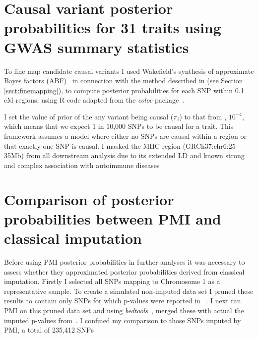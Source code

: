 \documentclass[a4paper,11pt]{report}
\begin{document}
\section{Causal variant posterior probabilities for 31 traits using GWAS summary statistics}
To fine map candidate causal variants I used Wakefield's synthesis of approximate Bayes factors (ABF)~\citep{Wakefield2009} in connection with the method described in \citet{The_Wellcome_Trust_Case_Control_Consortium2012-ad} (see Section \ref{sect:finemapping}), to compute posterior probabilities for each SNP within 0.1 cM regions, using R code adapted from the \textit{coloc} package~\citep{GiambartolomeiVukcevicSchadtEtAl2014}.  

I set the value of prior of the any variant being causal ($\pi_{i}$) to that from \citet{GiambartolomeiVukcevicSchadtEtAl2014}, $10^{-4}$, which means that we expect 1 in 10,000 SNPs to be causal for a trait. This framework assumes a model where either no SNPs are causal within a region or that exactly one SNP is causal. I masked the MHC region (GRCh37:chr6:25-35Mb) from all downstream analysis due to its extended LD and known strong and complex association with autoimmune diseases

\section{Comparison of posterior probabilities between PMI and classical imputation}
Before using PMI posterior probabilities in further analyses it was necessary to assess whether they approximated posterior probabilities derived from classical imputation. Firstly I selected all SNPs mapping to Chromosome 1 as a representative sample. To create a simulated non-imputed data set I pruned these results to contain only SNPs for which p-values were reported in ~\citet{Stahl2010-wz}. I next ran PMI on this pruned data set and using \textit{bedtools}~\citep{Quinlan2014}, merged these with actual the imputed p-values from~\citet{Okada2014-um}. I confined my comparison to those SNPs imputed by PMI, a total of 235,412 SNPs

\

\end{document}
